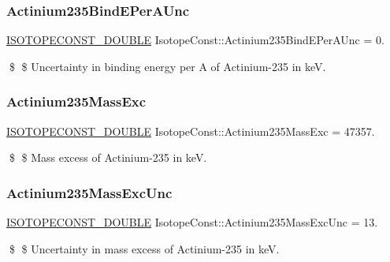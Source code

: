 \subsubsection{\texorpdfstring{Actinium235\+Bind\+E\+Per\+A\+Unc}{Actinium235BindEPerAUnc}}
{\footnotesize\ttfamily \mbox{\hyperlink{group___isotope_const-_macros_ga8f45a7272ce02c0b4c65c44636ed719a}{I\+S\+O\+T\+O\+P\+E\+C\+O\+N\+S\+T\+\_\+\+D\+O\+U\+B\+LE}} Isotope\+Const\+::\+Actinium235\+Bind\+E\+Per\+A\+Unc = 0.}

\$ \$ Uncertainty in binding energy per A of Actinium-\/235 in keV. \mbox{\label{group___isotope_const-_actinium-_ac235_gab0cd839151553d37b3a210c8c1a926b2}} 
\subsubsection{\texorpdfstring{Actinium235\+Mass\+Exc}{Actinium235MassExc}}
{\footnotesize\ttfamily \mbox{\hyperlink{group___isotope_const-_macros_ga8f45a7272ce02c0b4c65c44636ed719a}{I\+S\+O\+T\+O\+P\+E\+C\+O\+N\+S\+T\+\_\+\+D\+O\+U\+B\+LE}} Isotope\+Const\+::\+Actinium235\+Mass\+Exc = 47357.}

\$ \$ Mass excess of Actinium-\/235 in keV. \mbox{\label{group___isotope_const-_actinium-_ac235_gae6033964ad532dd6ceac8262eb935478}} 
\subsubsection{\texorpdfstring{Actinium235\+Mass\+Exc\+Unc}{Actinium235MassExcUnc}}
{\footnotesize\ttfamily \mbox{\hyperlink{group___isotope_const-_macros_ga8f45a7272ce02c0b4c65c44636ed719a}{I\+S\+O\+T\+O\+P\+E\+C\+O\+N\+S\+T\+\_\+\+D\+O\+U\+B\+LE}} Isotope\+Const\+::\+Actinium235\+Mass\+Exc\+Unc = 13.}

\$ \$ Uncertainty in mass excess of Actinium-\/235 in keV. \mbox{\label{group___isotope_const-_actinium-_ac235_gaaca2b20fcd6f0236dd508ffadb010d63}} 
